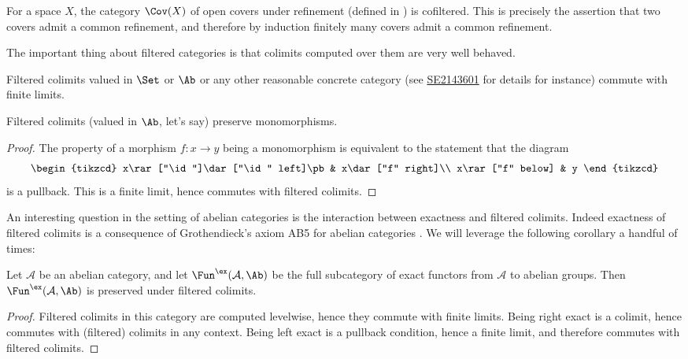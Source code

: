 \documentclass[11pt]{amsart}
\begin{document}
\begin{example}\label{exa:CovX-filtered} For a space $X$, the category $\Cov(X)$ of open covers under refinement (defined in ) is cofiltered. This is precisely the assertion that two covers admit a common refinement, and therefore by induction finitely many covers admit a common refinement.
\end{example}

The important thing about filtered categories is that colimits computed over them are very well behaved.

\begin{proposition} Filtered colimits valued in $\Set$ or $\Ab$ or any other reasonable concrete category (see \href{https://math.stackexchange.com/a/2143601}{SE2143601} for details for instance) commute with finite limits.
\end{proposition}

\begin{corollary} Filtered colimits (valued in $\Ab$, let's say) preserve monomorphisms.
\end{corollary}
\begin{proof} The property of a morphism $f \colon x \to y$ being a monomorphism is equivalent to the statement that the diagram
\[ \begin{tikzcd}
    x\rar["\id"]\dar["\id" left]\pb & x\dar["f" right]\\
    x\rar["f" below] & y
\end{tikzcd} \]
is a pullback. This is a finite limit, hence commutes with filtered colimits.
\end{proof}

An interesting question in the setting of abelian categories is the interaction between exactness and filtered colimits. Indeed exactness of filtered colimits is a consequence of Grothendieck's axiom AB5 for abelian categories \cite[1.8.1]{Tohoku}. We will leverage the following corollary a handful of times:

\begin{corollary}\label{cor:filtered-colimits-preserve-exactness} 
Let $\mathcal{A}$ be an abelian category, and let $\Fun^\ex(\mathcal{A},\Ab)$ be the full subcategory of exact functors from $\mathcal{A}$ to abelian groups. Then $\Fun^\ex(\mathcal{A},\Ab)$ is preserved under filtered colimits.
\end{corollary}
\begin{proof} Filtered colimits in this category are computed levelwise, hence they commute with finite limits. Being right exact is a colimit, hence commutes with (filtered) colimits in any context. Being left exact is a pullback condition, hence a finite limit, and therefore commutes with filtered colimits.
\end{proof}
\end{document}
